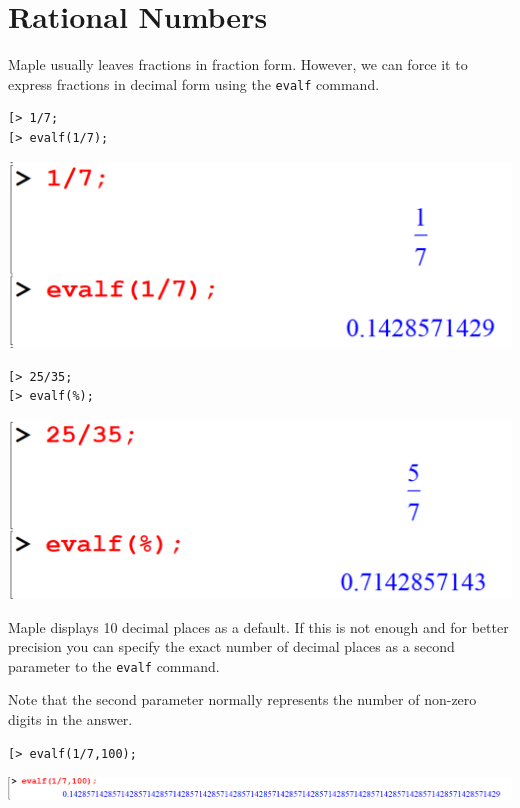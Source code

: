 \documentclass[
]{book}
\theoremstyle{definition}
\theoremstyle{definition}
\theoremstyle{definition}
\theoremstyle{definition}
\theoremstyle{remark}
\begin{document}
\section{Rational Numbers}\label{rational-numbers}

Maple usually leaves fractions in fraction form. However, we can force it to express fractions in decimal form using the \texttt{evalf} command.

\begin{verbatim}
[> 1/7;
[> evalf(1/7);
\end{verbatim}

\includegraphics{figures/Lesson 1/fig34.png}

\begin{verbatim}
[> 25/35;
[> evalf(%);
\end{verbatim}

\includegraphics{figures/Lesson 1/fig35.png}

Maple displays 10 decimal places as a default. If this is not enough and for better precision you can specify the exact number of decimal places as a second parameter to the \texttt{evalf} command.

Note that the second parameter normally represents the number of non-zero digits in the answer.

\begin{verbatim}
[> evalf(1/7,100);
\end{verbatim}

\includegraphics{figures/Lesson 1/fig36.png}
\end{document}
